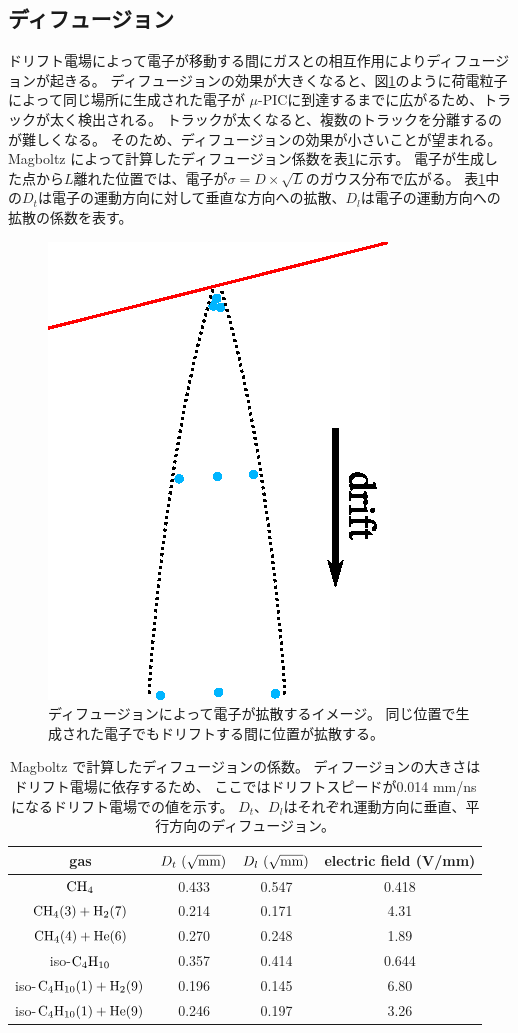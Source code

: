\subsection{ディフュージョン}
ドリフト電場によって電子が移動する間にガスとの相互作用によりディフュージョンが起きる。
ディフュージョンの効果が大きくなると、図\ref{fig::diffusion-image}のように荷電粒子によって同じ場所に生成された電子が
$\mu$-PICに到達するまでに広がるため、トラックが太く検出される。
トラックが太くなると、複数のトラックを分離するのが難しくなる。
そのため、ディフュージョンの効果が小さいことが望まれる。
Magboltz によって計算したディフュージョン係数を表\ref{tab::diffusion}に示す。
電子が生成した点から$L$離れた位置では、電子が$\sigma = D\times\sqrt{L}$のガウス分布で広がる。
表\ref{tab::diffusion}中の$D_{t}$は電子の運動方向に対して垂直な方向への拡散、$D_{l}$は電子の運動方向への拡散の係数を表す。
\begin{figure}
  \centering
  \includegraphics[clip, width=0.4\columnwidth]{eps/diffusion_image.eps}
  \caption[ディフュージョンによって電子が拡散するイメージ。]
          {ディフュージョンによって電子が拡散するイメージ。
          同じ位置で生成された電子でもドリフトする間に位置が拡散する。}
  \label{fig::diffusion-image}
\end{figure}
\begin{table}
  \centering
  \caption[Magboltz で計算したディフュージョンの係数。]
          {Magboltz で計算したディフュージョンの係数。
            ディフージョンの大きさはドリフト電場に依存するため、
            ここではドリフトスピードが0.014 mm/ns になるドリフト電場での値を示す。
          $D_{t}$、$D_{l}$はそれぞれ運動方向に垂直、平行方向のディフュージョン。}
  \label{tab::diffusion}
  \begin{tabular}{cccc}
    \toprule
    gas & $D_{t}~(\sqrt{\rm mm})$ & $D_{l}~(\sqrt{\rm mm})$ & electric field (V/mm) \\
    \midrule
    ${\rm CH_{4}}$ & 0.433 & 0.547 & 0.418\\
    ${\rm CH_{4} (3) + H_{2} (7)}$ & 0.214 & 0.171 & 4.31\\
    ${\rm CH_{4} (4) + He (6)}$ & 0.270  & 0.248 & 1.89\\
    iso-${\rm C_{4}H_{10}}$ & 0.357 & 0.414 & 0.644\\
    iso-${\rm C_{4}H_{10} (1) + H_{2}} (9)$ & 0.196 & 0.145 & 6.80\\
    iso-${\rm C_{4}H_{10} (1) + He} (9) $ & 0.246 & 0.197 & 3.26\\
    \bottomrule
  \end{tabular}
\end{table}
